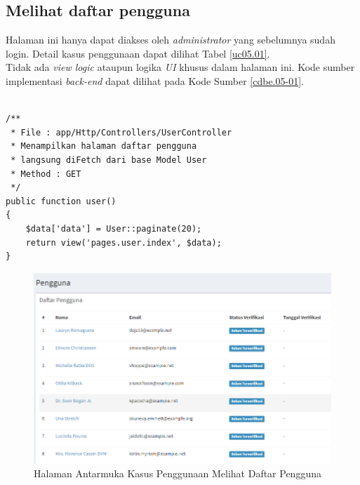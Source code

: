 \subsection{Melihat daftar pengguna}
Halaman ini hanya dapat diakses oleh \textit{administrator} yang sebelumnya sudah login. Detail kasus penggunaan dapat dilihat Tabel \ref{uc05.01}.\\
\indent Tidak ada \textit{view logic} ataupun logika \textit{UI} khusus dalam halaman ini. Kode sumber implementasi \textit{back-end} dapat dilihat pada Kode Sumber \ref{cdbe.05-01}.

\begin{lstlisting}[label=cdbe.05-01,style=php,caption=Kode Sumber Antarmuka Registrasi]

/** 
 * File : app/Http/Controllers/UserController
 * Menampilkan halaman daftar pengguna
 * langsung diFetch dari base Model User
 * Method : GET
 */
public function user()
{
    $data['data'] = User::paginate(20);
    return view('pages.user.index', $data);
}
\end{lstlisting}
      
  \begin{figure}[H]
    \centering
    \includegraphics[width=\textwidth]{images/bab4/ui/05-01.png}
    \caption{Halaman Antarmuka Kasus Penggunaan Melihat Daftar Pengguna}
    \label{ui.05-01}
  \end{figure}
      
